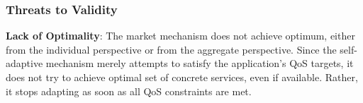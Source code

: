 \documentclass[10pt,journal,compsoc]{IEEEtran}
\begin{document}
\subsubsection{Threats to Validity}

\textbf{Lack of Optimality}: The market mechanism does not achieve optimum, either from the individual perspective or from the aggregate perspective. Since the self-adaptive mechanism merely attempts to satisfy the application's QoS targets, it does not try to achieve  optimal set of concrete services, even if available. Rather, it stops adapting as soon as all QoS constraints are met.
\end{document}
